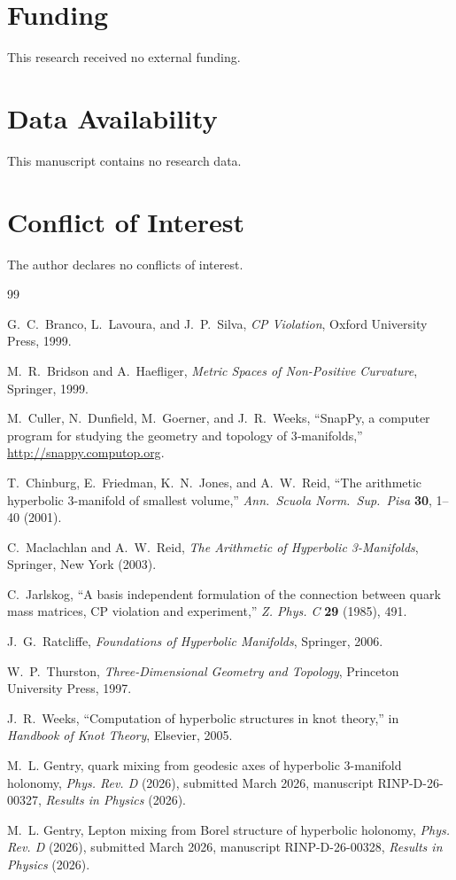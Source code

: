 \documentclass[12pt]{article}
\begin{document}
\section*{Funding}
This research received no external funding.

\section*{Data Availability}
This manuscript contains no research data.

\section*{Conflict of Interest}
The author declares no conflicts of interest.

\begin{thebibliography}{99}

G.~C.~Branco, L.~Lavoura, and J.~P.~Silva,
\emph{CP Violation},
Oxford University Press, 1999.

M.~R.~Bridson and A.~Haefliger,
\emph{Metric Spaces of Non-Positive Curvature},
Springer, 1999.

M.~Culler, N.~Dunfield, M.~Goerner, and J.~R.~Weeks,
``SnapPy, a computer program for studying the geometry and topology
of 3‑manifolds,'' \url{http://snappy.computop.org}.

T.~Chinburg, E.~Friedman, K.~N.~Jones, and A.~W.~Reid,
``The arithmetic hyperbolic 3-manifold of smallest volume,''
\emph{Ann.\ Scuola Norm.\ Sup.\ Pisa} \textbf{30}, 1--40 (2001).

C.~Maclachlan and A.~W.~Reid,
\emph{The Arithmetic of Hyperbolic 3-Manifolds},
Springer, New York (2003).

C.~Jarlskog,
``A basis independent formulation of the connection between quark mass
matrices, CP violation and experiment,''
\emph{Z. Phys. C} \textbf{29} (1985), 491.

J.~G.~Ratcliffe,
\emph{Foundations of Hyperbolic Manifolds},
Springer, 2006.

W.~P.~Thurston,
\emph{Three-Dimensional Geometry and Topology},
Princeton University Press, 1997.

J.~R.~Weeks,
``Computation of hyperbolic structures in knot theory,''
in \emph{Handbook of Knot Theory}, Elsevier, 2005.


M.~L. Gentry,
 quark mixing from geodesic axes of hyperbolic 3-manifold holonomy,
\newblock \emph{Phys. Rev. D} (2026), submitted March 2026, manuscript RINP-D-26-00327, \emph{Results in Physics} (2026).

M.~L. Gentry,
\newblock Lepton mixing from Borel structure of hyperbolic holonomy,
\newblock \emph{Phys. Rev. D} (2026), submitted March 2026, manuscript RINP-D-26-00328, \emph{Results in Physics} (2026).
\end{thebibliography}
\end{document}
